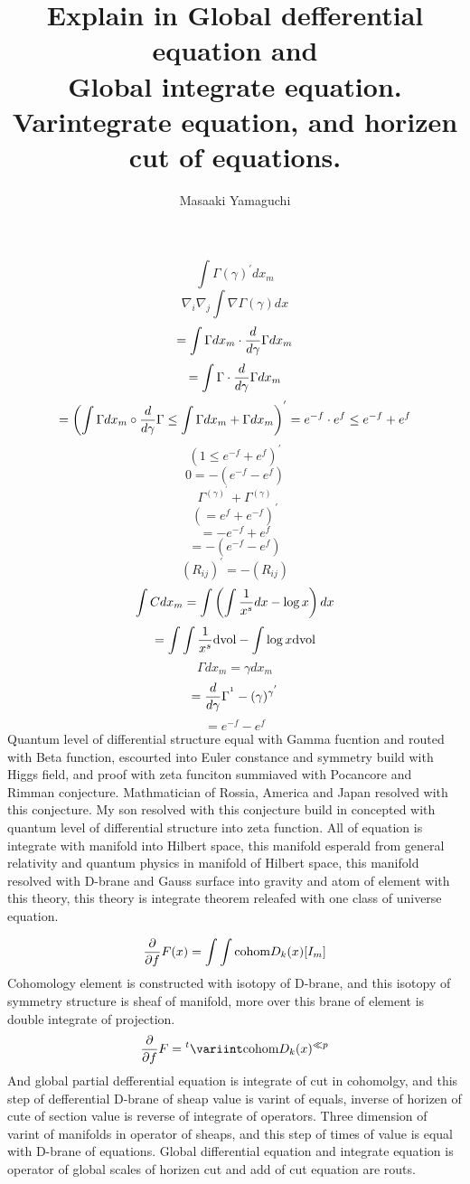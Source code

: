 \documentclass{jsarticle}
\begin{document}
{  $$ \int \Gamma(\gamma)^{'}dx_m $$
  $$ \nabla_i \nabla_j \int \nabla \Gamma(\gamma)dx $$
  $$ = \int \Gamma dx_m \cdot {d \over d \gamma}\Gamma dx_m $$
  $$ = \int \Gamma \cdot {d \over d \gamma}\Gamma dx_m $$
  $$ = \left(\int \Gamma dx_m \circ {d \over d\gamma}\Gamma \le
  \int \Gamma dx_m + \Gamma dx_m \right)^{'} 
  = e^{-f} \cdot e^{f} \le e^{-f} + e^{f} $$
  $$ \left(1 \le e^{-f} + e^{f}\right)^{'} $$
  $$ 0 = -(e^{-f} - e^{f}) $$
  $$ \Gamma^{(\gamma)^{'}} + \Gamma^{(\gamma)} $$
  $$ (= e^f + e^{-f})^{'} $$
  $$ = - e^{-f} + e^{f} $$
  $$ = - (e^{-f} - e^f) $$
  $$ (R_{ij})^{'} = - (R_{ij}) $$
  $$ \int C dx_m = \int\left(\int{1 \over x^s}dx - \log x \right)dx $$
  $$ = \int \int{1 \over x^s}\mathrm{dvol} - \int \log x \mathrm{dvol} $$
  $$ \Gamma dx_m = \gamma dx_m $$
  $$ = {d \over d \gamma}\Gamma^{^1} - (\gamma)^{\gamma^{'}} $$
  $$ = e^{-f} - e^{f} $$
  Quantum level of differential structure equal with Gamma fucntion and
  routed with Beta function, escourted into Euler constance and symmetry 
  build with Higgs field, and proof with zeta funciton summiaved with 
  Pocancore and Rimman conjecture.
  Mathmatician of Rossia, America and Japan resolved with this conjecture.
  My son resolved with this conjecture build in concepted with quantum
  level of differential structure into zeta function.
  All of equation is integrate with manifold into Hilbert space,
  this manifold esperald from general relativity and quantum physics
  in manifold of Hilbert space, this manifold resolved with D-brane
  and Gauss surface into gravity and atom of element with this theory,
  this theory is integrate theorem releafed with one class of universe 
  equation.

\newpage
\title{Explain in Global defferential equation and \\
Global integrate equation. \\
Varintegrate equation, and horizen cut of equations.}
\author{Masaaki Yamaguchi}


 $$ {\partial \over \partial f}F(x) = \int \int \text{cohom}D_k(x)[I_m]  $$
 Cohomology element is constructed with isotopy of D-brane,
 and this isotopy of symmetry structure is sheaf of manifold,
 more over this brane of element is double integrate of projection.
 $$ {\partial \over \partial f}F = {{}^t \variint} \text{cohom}D_k(x)^{\ll p} $$
 And global partial defferential equation is integrate of cut in cohomolgy,
 and this step of defferential D-brane of sheap value is varint of equals,
 inverse of horizen of cute of section value is reverse of integrate of 
 operators. Three dimension of varint of manifolds in operator of sheaps,
 and this step of times of value is equal with D-brane of equations.
 Global differential equation and integrate equation is operator of 
 global scales of horizen cut and add of cut equation are routs.

}
\end{document}
